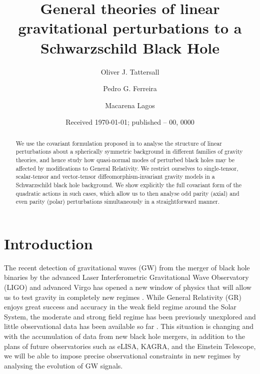\documentclass[10pt,twocolumn,preprintnumbers,amsmath,amssymb,nofootinbib
,superscriptaddress]{revtex4-1}
\begin{document}
\title{General theories of linear gravitational perturbations to a Schwarzschild Black Hole}
\author{Oliver J. Tattersall}
\author{Pedro G. Ferreira}
\author{Macarena Lagos}
\date{Received \today; published -- 00, 0000}

\begin{abstract}
We use the covariant formulation proposed in \cite{Tattersall:2017eav} to analyse the structure of linear perturbations about a spherically symmetric background in different families of gravity theories, and hence study how quasi-normal modes of perturbed black holes may be affected by modifications to General Relativity. We restrict ourselves to single-tensor, scalar-tensor and vector-tensor diffeomorphism-invariant gravity models in a Schwarzschild black hole background. We show explicitly the full covariant form of the quadratic actions in such cases, which allow us to then analyse odd parity (axial) and even parity (polar) perturbations simultaneously in a straightforward manner. 
\end{abstract}


\maketitle
\section{Introduction}

The recent detection of gravitational waves (GW) from the merger of black hole binaries by the advanced Laser Interferometric Gravitational Wave Observatory (LIGO) \cite{2016PhRvL.116f1102A,2016PhRvL.116x1103A,2017PhRvL.118v1101A} and advanced Virgo \cite{2017arXiv170909660T} has opened a new window of physics that will allow us to test gravity in completely new regimes \cite{2016PhRvL.116v1101A}. While General Relativity (GR) enjoys great success and accuracy in the weak field regime around the Solar System, the moderate and strong field regime has been previously unexplored and little observational data has been available so far \cite{Berti:2015itd}. This situation is changing and with the accumulation of data from new black hole mergers, in addition to the plans of future observatories such as eLISA, KAGRA, and the Einstein Telescope, we will be able to impose precise observational constraints in new regimes by analysing the evolution of GW signals.
\end{document}
